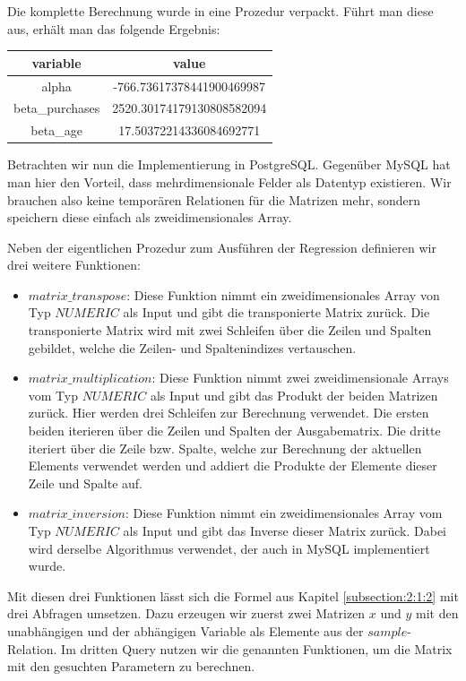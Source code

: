 Die komplette Berechnung wurde in eine Prozedur verpackt. Führt man diese aus, erhält man das folgende Ergebnis:

\begin{center}
  \begin{tabular}{|c|c|}\hline
    \textbf{variable} & \textbf{value} \\ \hline
    alpha & -766.73617378441900469987 \\ \hline
    beta\_purchases & 2520.30174179130808582094 \\ \hline
    beta\_age & 17.50372214336084692771 \\ \hline
  \end{tabular}
\end{center}

Betrachten wir nun die Implementierung in PostgreSQL. Gegenüber MySQL hat man hier den Vorteil, dass mehrdimensionale Felder als Datentyp existieren. Wir brauchen also keine temporären Relationen für die Matrizen mehr, sondern speichern diese einfach als zweidimensionales Array.

Neben der eigentlichen Prozedur zum Ausführen der Regression definieren wir drei weitere Funktionen:
\begin{itemize}
  \item $matrix\_transpose$: Diese Funktion nimmt ein zweidimensionales Array von Typ $NUMERIC$ als Input und gibt die transponierte Matrix zurück. Die transponierte Matrix wird mit zwei Schleifen über die Zeilen und Spalten gebildet, welche die Zeilen- und Spaltenindizes vertauschen.
  \item $matrix\_multiplication$: Diese Funktion nimmt zwei zweidimensionale Arrays vom Typ $NUMERIC$ als Input und gibt das Produkt der beiden Matrizen zurück. Hier werden drei Schleifen zur Berechnung verwendet. Die ersten beiden iterieren über die Zeilen und Spalten der Ausgabematrix. Die dritte iteriert über die Zeile bzw. Spalte, welche zur Berechnung der aktuellen Elements verwendet werden und addiert die Produkte der Elemente dieser Zeile und Spalte auf.
  \item $matrix\_inversion$: Diese Funktion nimmt ein zweidimensionales Array vom Typ $NUMERIC$ als Input und gibt das Inverse dieser Matrix zurück. Dabei wird derselbe Algorithmus verwendet, der auch in MySQL implementiert wurde.
\end{itemize}

Mit diesen drei Funktionen lässt sich die Formel aus Kapitel \ref{subsection:2:1:2} mit drei Abfragen umsetzen. Dazu erzeugen wir zuerst zwei Matrizen $x$ und $y$ mit den unabhängigen und der abhängigen Variable als Elemente aus der $sample$-Relation. Im dritten Query nutzen wir die genannten Funktionen, um die Matrix mit den gesuchten Parametern zu berechnen.

